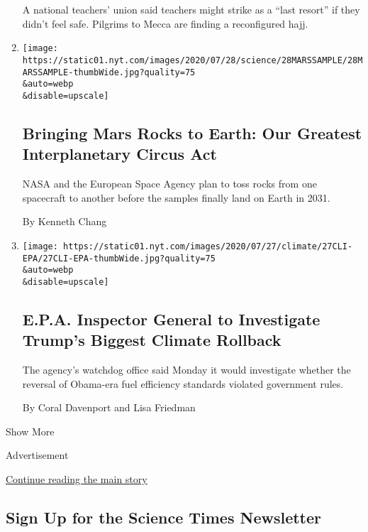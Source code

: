 \begin{enumerate}
  A national teachers' union said teachers might strike as a ``last
  resort'' if they didn't feel safe. Pilgrims to Mecca are finding a
  reconfigured hajj.
\item
  \href{/2020/07/28/science/mars-sample-return-mission.html}{}

  \texttt{[image: https://static01.nyt.com/images/2020/07/28/science/28MARSSAMPLE/28MARSSAMPLE-thumbWide.jpg?quality=75\\\&auto=webp\\\&disable=upscale]}

  \hypertarget{bringing-mars-rocks-to-earth-our-greatest-interplanetary-circus-act}{%
  \subsection{Bringing Mars Rocks to Earth: Our Greatest Interplanetary
  Circus
  Act}\label{bringing-mars-rocks-to-earth-our-greatest-interplanetary-circus-act}}

  NASA and the European Space Agency plan to toss rocks from one
  spacecraft to another before the samples finally land on Earth in
  2031.

  By Kenneth Chang
\item
  \href{/2020/07/27/climate/trump-fuel-efficiency-rule.html}{}

  \texttt{[image: https://static01.nyt.com/images/2020/07/27/climate/27CLI-EPA/27CLI-EPA-thumbWide.jpg?quality=75\\\&auto=webp\\\&disable=upscale]}

  \hypertarget{epa-inspector-general-to-investigate-trumps-biggest-climate-rollback}{%
  \subsection{E.P.A. Inspector General to Investigate Trump's Biggest
  Climate
  Rollback}\label{epa-inspector-general-to-investigate-trumps-biggest-climate-rollback}}

  The agency's watchdog office said Monday it would investigate whether
  the reversal of Obama-era fuel efficiency standards violated
  government rules.

  By Coral Davenport and Lisa Friedman
\end{enumerate}

Show More

Advertisement

\protect\hyperlink{after-mid2}{Continue reading the main story}

\hypertarget{sign-up-for-the-science-times-newsletter}{%
\subsection{Sign Up for the Science Times
Newsletter}\label{sign-up-for-the-science-times-newsletter}}

